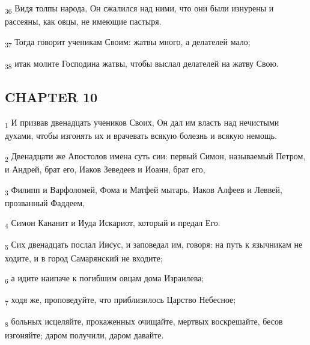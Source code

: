 \begin{tcolorbox}
\textsubscript{36} Видя толпы народа, Он сжалился над ними, что они были изнурены и рассеяны, как овцы, не имеющие пастыря.
\end{tcolorbox}
\begin{tcolorbox}
\textsubscript{37} Тогда говорит ученикам Своим: жатвы много, а делателей мало;
\end{tcolorbox}
\begin{tcolorbox}
\textsubscript{38} итак молите Господина жатвы, чтобы выслал делателей на жатву Свою.
\end{tcolorbox}
\subsection{CHAPTER 10}
\begin{tcolorbox}
\textsubscript{1} И призвав двенадцать учеников Своих, Он дал им власть над нечистыми духами, чтобы изгонять их и врачевать всякую болезнь и всякую немощь.
\end{tcolorbox}
\begin{tcolorbox}
\textsubscript{2} Двенадцати же Апостолов имена суть сии: первый Симон, называемый Петром, и Андрей, брат его, Иаков Зеведеев и Иоанн, брат его,
\end{tcolorbox}
\begin{tcolorbox}
\textsubscript{3} Филипп и Варфоломей, Фома и Матфей мытарь, Иаков Алфеев и Леввей, прозванный Фаддеем,
\end{tcolorbox}
\begin{tcolorbox}
\textsubscript{4} Симон Кананит и Иуда Искариот, который и предал Его.
\end{tcolorbox}
\begin{tcolorbox}
\textsubscript{5} Сих двенадцать послал Иисус, и заповедал им, говоря: на путь к язычникам не ходите, и в город Самарянский не входите;
\end{tcolorbox}
\begin{tcolorbox}
\textsubscript{6} а идите наипаче к погибшим овцам дома Израилева;
\end{tcolorbox}
\begin{tcolorbox}
\textsubscript{7} ходя же, проповедуйте, что приблизилось Царство Небесное;
\end{tcolorbox}
\begin{tcolorbox}
\textsubscript{8} больных исцеляйте, прокаженных очищайте, мертвых воскрешайте, бесов изгоняйте; даром получили, даром давайте.
\end{tcolorbox}
